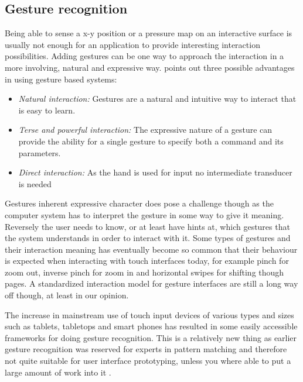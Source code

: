 \begin{figure}[h]
\begin{minipage}{.3\textwidth}
  \label{sofa_interaction:unmousepad}
\end{minipage}
\end{figure}

\subsection{Gesture recognition}
Being able to sense a x-y position or a pressure map on an interactive surface is usually not enough for an application to provide interesting interaction possibilities.
Adding gestures can be one way to approach the interaction in a more involving, natural and expressive way.
\citet{baudel1993charade} points out three possible advantages in using gesture based systems:
\begin{itemize}
  \item \emph{Natural interaction:} Gestures are a natural and intuitive way to interact that is easy to learn.
  \item \emph{Terse and powerful interaction:} The expressive nature of a gesture can provide the ability for a single gesture to specify both a command and its parameters.
  \item \emph{Direct interaction:} As the hand is used for input no intermediate transducer is needed
\end{itemize}
Gestures inherent expressive character does pose a challenge though as the computer system has to interpret the gesture in some way to give it meaning.
Reversely the user needs to know, or at least have hints at, which gestures that the system understands in order to interact with it.
Some types of gestures and their interaction meaning has eventually become so common that their behaviour is expected when interacting with touch interfaces today, for example pinch for zoom out, inverse pinch for zoom in and horizontal swipes for shifting though pages.
A standardized interaction model for gesture interfaces are still a long way off though, at least in our opinion. 

The increase in mainstream use of touch input devices of various types and sizes such as tablets, tabletops and smart phones has resulted in some easily accessible frameworks for doing gesture recognition.
This is a relatively new thing as earlier gesture recognition was reserved for experts in pattern matching and therefore not quite suitable for user interface prototyping, unless you where able to put a large amount of work into it \citep{wobbrock2007gestures}.  


